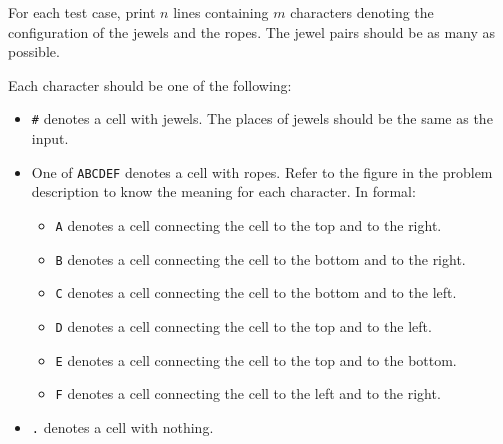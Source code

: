 For each test case, print $n$ lines containing $m$ characters denoting the configuration of the jewels and the ropes.
The jewel pairs should be as many as possible.

Each character should be one of the following:
\begin{itemize}
\item \texttt{\#} denotes a cell with jewels. The places of jewels should be the same as the input.
\item One of \texttt{ABCDEF} denotes a cell with ropes. Refer to the figure in the problem description to know the meaning for each character. In formal:
\begin{itemize}
    \item \texttt{A} denotes a cell connecting the cell to the top and to the right.
    \item \texttt{B} denotes a cell connecting the cell to the bottom and to the right.
    \item \texttt{C} denotes a cell connecting the cell to the bottom and to the left.
    \item \texttt{D} denotes a cell connecting the cell to the top and to the left.
    \item \texttt{E} denotes a cell connecting the cell to the top and to the bottom.
    \item \texttt{F} denotes a cell connecting the cell to the left and to the right.
\end{itemize}
\item \texttt{.} denotes a cell with nothing.
\end{itemize}